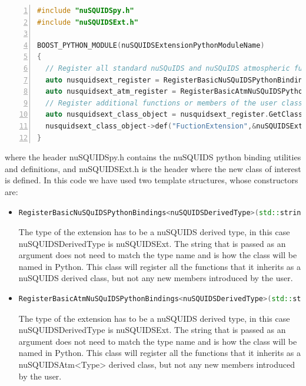 \documentclass[3p,12pt]{elsarticle}
\newcommand{\ttf}{\ttfamily}
\begin{document}
\begin{lstlisting}[language=C++, frame=leftline, numbers=left, breaklines=true]
#include "nuSQUIDSpy.h"
#include "nuSQUIDSExt.h"

BOOST_PYTHON_MODULE(nuSQUIDSExtensionPythonModuleName)
{
  // Register all standard nuSQuIDS and nuSQuIDS atmospheric functions for the user class
  auto nusquidsext_register = RegisterBasicNuSQuIDSPythonBindings<nuSQUIDSExt>("nuSQUIDSExt");
  auto nusquidsext_atm_register = RegisterBasicAtmNuSQuIDSPythonBindings<nuSQUIDSExt>("nuSQUIDSExtAtm");
  // Register additional functions or members of the user class
  auto nusquidsext_class_object = nusquidsext_register.GetClassObject();
  nusquidsext_class_object->def("FuctionExtension",&nuSQUIDSExt::FunctionExtension);
}
\end{lstlisting}
where the header {\ttf nuSQUIDSpy.h} contains the nuSQUIDS python binding utilities and definitions, and {\ttf nuSQUIDSExt.h} is the 
header where the new class of interest is defined. In this code we have used two template structures, whose constructors are:
\begin{itemize}
  \item
    \begin{lstlisting}[language=C++, breaklines=true]
      RegisterBasicNuSQuIDSPythonBindings<nuSQUIDSDerivedType>(std::string name);
    \end{lstlisting}
    The {\ttf type} of the extension has to be a {\ttf nuSQUIDS} derived type, in this case \\
  {\ttf nuSQUIDSDerivedType} is {\ttf nuSQUIDSExt}. The string that is passed
  as an argument does not need to match the type name and is how the class will be named in {\ttf Python}. This class will register all the functions
  that it inherits as a nuSQUIDS derived class, but not any new members introduced by the user.
  \item
    \begin{lstlisting}[language=C++, breaklines=true]
      RegisterBasicAtmNuSQuIDSPythonBindings<nuSQUIDSDerivedType>(std::string name);
    \end{lstlisting}
    The {\ttf type} of the extension has to be a {\ttf nuSQUIDS} derived type, in this case \\ {\ttf nuSQUIDSDerivedType} is {\ttf nuSQUIDSExt}. The string that is passed
  as an argument does not need to match the type name and is how the class will be named in {\ttf Python}. This class will register all the functions
    that it inherits as a {\ttf nuSQUIDSAtm<Type>} derived class, but not any new members introduced by the user.
\end{itemize}
\end{document}
